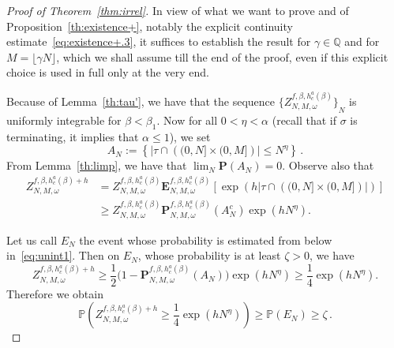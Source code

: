 \documentclass[11pt]{article}
\theoremstyle{definition}
\numberwithin{equation}{section}
\numberwithin{figure}{section}
\numberwithin{table}{section}
\newcommand{\ga}{\alpha}
\newcommand{\bP}{\ensuremath{\mathbf{P}}}
\newcommand{\bE}{\ensuremath{\mathbf{E}}}
\newcommand{\bbP}{\ensuremath{\mathbb{P}}}
\newcommand{\bbQ}{\ensuremath{\mathbb{Q}}}
\begin{document}
\begin{proof}[Proof of Theorem~\ref{thm:irrel}]
In view of what we want to prove and of Proposition~\ref{th:existence+}, notably the explicit continuity estimate~\eqref{eq:existence+.3}, it suffices to establish the result for $\gamma\in \bbQ$ and for $M=\lfloor \gamma N \rfloor$, which we shall assume till the end of the proof, even if this explicit choice is used in full only at the very end.

Because of Lemma~\ref{th:tau'}, we have that the sequence ${ \lbrace Z_{N,M,\omega}^{f,\beta,h_c^a(\beta)} \rbrace}_{N}$ is uniformly integrable for $\beta<\beta_1$. Now for all $0<\eta < \ga$ (recall that if $\sigma$ is terminating, it implies that $\ga\leq 1$), we set
\begin{equation}\label{eq:AN}
A_{N} := \left\lbrace \vert \tau \cap \left((0,N] \times (0,M] \right) \rvert \le N^{\eta} \right\rbrace\,.
\end{equation}
From Lemma~\ref{th:limp}, we have that $\lim_N \bP(A_{N}) =0$. Observe also that
\begin{equation}\label{eq:binfz}
\begin{split}
Z_{N,M,\omega}^{f,\beta,h_c^a(\beta)+h} & = Z_{N,M,\omega}^{f,\beta,h_c^a(\beta)} \bE_{N,M,\omega}^{f,\beta,h_c^a(\beta)} \left[\exp \left(h \lvert \tau \cap \left((0,N]\times(0,M] \right) \rvert \right)\right] \\
& \ge Z_{N,M,\omega}^{f,\beta,h_c^a(\beta)} \bP_{N,M,\omega}^{f,\beta,h_c^a(\beta)} \left({A}^{c}_{N} \right) \exp \left(h N^{\eta} \right).
\end{split}
\end{equation}


Let us call $E_N$ the event whose probability is estimated from below in~\eqref{eq:unint1}. Then on $E_N$, whose probability is at least $\zeta >0$, we have
\begin{equation}\label{eq:zfb}
Z_{N,M,\omega}^{f,\beta,h_c^a(\beta)+h}
\ge \frac{1}{2} \Big(1- \bP_{N,M,\omega}^{f,\beta,h_c^a(\beta)} \left(A_{N} \right) \Big) \exp \left(h N^\eta\right)
\ge \frac1 4 \exp \left(h N^{\eta}\right).
\end{equation}
Therefore we obtain
\begin{equation}\label{eq:zfpb}
\bbP \left(Z_{N,M,\omega}^{f,\beta,h_c^a(\beta)+h} \ge \frac{1}{4} \exp \left(h N^{\eta}\right) \right) \ge \bbP\left(E_N\right) \ge \zeta\,.
\end{equation}


\end{proof}
\end{document}
